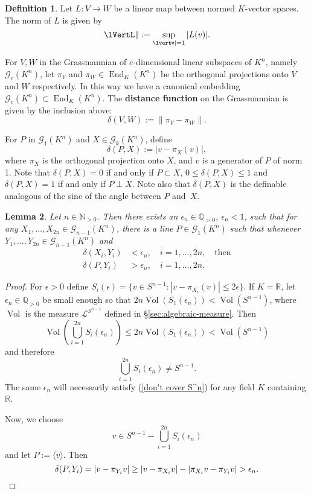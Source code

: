 \documentclass[a4paper, 12pt, final]{article}
\newtheorem{lem}{Lemma}[section]
\newtheorem{open problem}[lem]{Open problem}
\theoremstyle{remark}
\theoremstyle{definition}
\newtheorem{dfn}[lem]{Definition}
\newtheorem{final remark}[lem]{Final remark}
\begin{document}
\begin{dfn}
Let $L: V \to W$ be a linear map between normed ${K}$-vector spaces.   The norm
of $L$ is given by
\[
{\lVertL\rVert} := \sup_{{\lvertv\rvert} = 1}{\lvert{L(v)}\rvert}.
\]
\end{dfn}

For $V,W$ in the Grassmannian of $e$-dimensional linear subspaces of ${K}^n$,
namely $ \mathcal G_e({K}^n)$, let $\pi_V$ and $\pi_W\in\operatorname{End}_{K}({K}^n)$ be the
orthogonal projections onto $V$ and $W$ respectively. 
In this way we have a canonical embedding $\mathcal
G_e({K}^n)\subset\operatorname{End}_{K}({K}^n)$. 
The \textbf{distance function} on the Grassmannian is given by the inclusion
above: 
\[
\delta(V,W) := {\lVert{\pi_V-\pi_W}\rVert}.
\] 

 For $P$ in $\mathcal G_1({K}^n)$ and $X\in \mathcal G_k({K}^n)$, define
\[
\delta(P,X) := {\lvert{v-\pi_X(v)}\rvert},
\] 
where $\pi_X$ is the orthogonal projection onto $X$, and $v$ is a generator of $P$ of norm 1.
Note that $\delta(P,X)=0$ if and only if $P\subset X$, $0\leq\delta(P,X)\leq 1$ and $\delta(P,X)=1$ if and only if $P\perp X$.
Note also that $\delta(P, X)$ is the definable analogous of the sine of the
angle between $P$ and~$X$.

\begin{lem}\label{epsilon}
Let $n\in\mathbb{N}_{>0}$. Then there exists an
$\epsilon_n\in\mathbb{Q}_{>0}$, $\epsilon_n <1$, such that for any
$X_1,\dots,X_{2n}\in \mathcal G_{n-1}({K}^n)$, there is a line $P\in \mathcal
G_1({K}^n)$ such that whenever $Y_1,\dots,Y_{2n}\in \mathcal G_{n-1}({K}^n)$ 
and  
\[\begin{aligned}
\delta(X_i,Y_i) &< \epsilon_n, \quad i=1,\dots,2n, \quad \text{then}\\
\delta(P,Y_i)   &> \epsilon_n, \quad i=1,\dots,2n.
\end{aligned}\]
\end{lem}
\begin{proof} 
For $\epsilon>0$ define $S_i(\epsilon)=\{v\in S^{n-1} : |v-\pi_{X_i}(v)| \leq
2\epsilon\}$. 
If ${K}=\mathbb{R}$, let $\epsilon_n\in\mathbb{Q}_{>0}$ be small enough so that
$2n \operatorname{Vol}(S_1(\epsilon_n)) < \operatorname{Vol}(S^{n-1})$, where $\operatorname{Vol}$ is the measure
${\mathcal L}^{S^{n-1}}$ defined in \S\ref{sec:algebraic-measure}.
Then
\[
\operatorname{Vol}(\bigcup_{i=1}^{2n} S_i(\epsilon_n)) \leq 2n \operatorname{Vol}(S_1(\epsilon_n)) <
\operatorname{Vol}(S^{n-1})
\]
 and therefore
\begin{equation}\label{don't cover S^n}
\bigcup_{i=1}^{2n}S_i(\epsilon_n)\not=S^{n-1}.
\end{equation}
The same $\epsilon_n$ will necessarily satisfy (\ref{don't cover S^n}) for any field ${K}$ containing $\mathbb{R}$. 

Now, we choose
\[
v\in S^{n-1}-\bigcup_{i=1}^{2n}S_i(\epsilon_n)
\]
 and let $P:=\langle v\rangle$. Then
\[
\delta(P,Y_i)=|v-\pi_{Y_i}v|\geq|v-\pi_{X_i}v|-|\pi_{X_i}v-\pi_{Y_i}v|>\epsilon_n.
\qedhere
\]
\end{proof}
\end{document}
